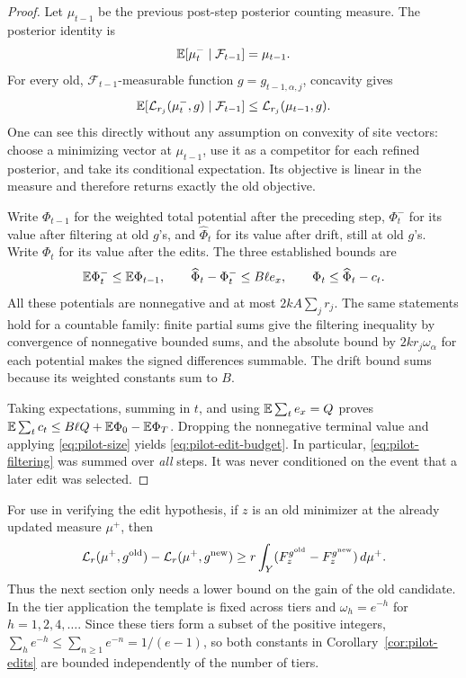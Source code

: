 \begin{proof}
Let $\mu_{t-1}$ be the previous post-step posterior counting measure.
The posterior identity is
\[
 \mathbb E[\mu_t^-\mid\mathcal F_{t-1}]=\mu_{t-1}.
\]
For every old, $\mathcal F_{t-1}$-measurable function
$g=g_{t-1,\alpha,j}$, concavity gives
\begin{equation}
 \mathbb E[\mathcal L_{r_j}(\mu_t^-,g)\mid\mathcal F_{t-1}]
       \le\mathcal L_{r_j}(\mu_{t-1},g).
 \label{eq:pilot-filtering}
\end{equation}
One can see this directly without any assumption on convexity of site
vectors: choose a minimizing vector at $\mu_{t-1}$, use it as a
competitor for each refined posterior, and take its conditional
expectation.  Its objective is linear in the measure and therefore
returns exactly the old objective.

Write $\Phi_{t-1}$ for the weighted total potential after the preceding
step, $\Phi_t^-$ for its value after filtering at old $g$'s, and
$\widehat\Phi_t$ for its value after drift, still at old $g$'s.  Write
$\Phi_t$ for its value after the edits.  The three established bounds
are
\[
 \mathbb E\Phi_t^-\le\mathbb E\Phi_{t-1},\qquad
 \widehat\Phi_t-\Phi_t^-\le B\ell e_x,
 \qquad \Phi_t\le\widehat\Phi_t-c_t.
\]
All these potentials are nonnegative and at most
$2kA\sum_jr_j$.  The same statements hold for a countable family:
finite partial sums give the filtering inequality by convergence of
nonnegative bounded sums, and the absolute bound by
$2kr_j\omega_\alpha$ for each potential makes the signed differences
summable.  The drift bound sums because its weighted constants sum to
$B$.

Taking expectations, summing in $t$, and using
$\mathbb E\sum_t e_x=Q$ proves
$\mathbb E\sum_t c_t\le B\ell Q+\mathbb E\Phi_0-\mathbb E\Phi_T$.
Dropping the nonnegative terminal value and applying
\eqref{eq:pilot-size} yields \eqref{eq:pilot-edit-budget}.
In particular, \eqref{eq:pilot-filtering} was summed over \emph{all}
steps.  It was never conditioned on the event that a later edit was
selected.
\end{proof}

For use in verifying the edit hypothesis, if $z$ is an old minimizer at
the already updated measure $\mu^+$, then
\begin{equation}
 \mathcal L_r(\mu^+,g^{\rm old})
      -\mathcal L_r(\mu^+,g^{\rm new})
 \ge r\int_Y(F_z^{g^{\rm old}}-F_z^{g^{\rm new}})\,d\mu^+.
 \label{eq:pilot-edit-candidate}
\end{equation}
Thus the next section only needs a lower bound on the gain of the old
candidate.  In the tier application the template is fixed across tiers
and $\omega_h=e^{-h}$ for $h=1,2,4,\ldots$.  Since these tiers form a
subset of the positive integers,
$\sum_h e^{-h}\le\sum_{n\ge1}e^{-n}=1/(e-1)$, so both constants in
Corollary~\ref{cor:pilot-edits} are bounded independently of the number
of tiers.
